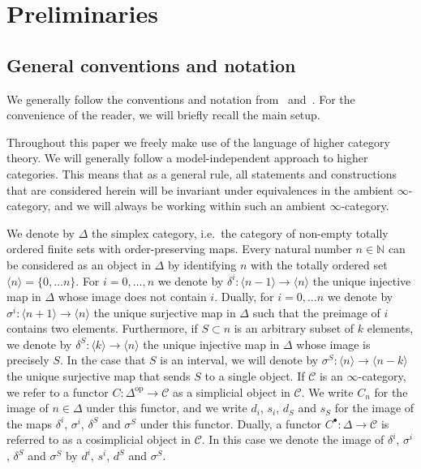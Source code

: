 \documentclass[reqno]{amsart}
\numberwithin{equation}{subsection}
\theoremstyle{plain}
\theoremstyle{definition}
\let\scr=\mathcal
\def\CC{\scr C}
\newcommand{\op}{\mathrm{op}}
\newcommand{\ord}[1]{\langle#1\rangle}
\begin{document}
\section{Preliminaries}

\subsection{General conventions and notation}
We generally follow the conventions and notation from~\cite{Martini2021} and~\cite{Martini2021a}. For the convenience of the reader, we will briefly recall the main setup. 

Throughout this paper we freely make use of the language of higher category theory. We will generally follow a model-independent approach to higher categories. This means that as a general rule, all statements and constructions that are considered herein will be invariant under equivalences in the ambient $\infty$-category, and we will always be working within such an ambient $\infty$-category.

We denote by $\Delta$ the simplex category, i.e.\ the category of non-empty totally ordered finite sets with order-preserving maps. Every natural number $n\in\mathbb N$ can be considered as an object in $\Delta$ by identifying $n$ with the totally ordered set $\ord{n}=\{0,\dots n\}$. For $i=0,\dots,n$ we denote by $\delta^i\colon \ord{n-1}\to \ord{n}$ the unique injective map in $\Delta$ whose image does not contain $i$. Dually, for $i=0,\dots n$ we denote by $\sigma^i\colon \ord{n+1}\to \ord{n}$ the unique surjective map in $\Delta$ such that the preimage of $i$ contains two elements. Furthermore, if $S\subset n$ is an arbitrary subset of $k$ elements, we denote by $\delta^S\colon \ord{k}\to \ord{n}$ the unique injective map in $\Delta$ whose image is precisely $S$. In the case that $S$ is an interval, we will denote by $\sigma^S\colon \ord{n}\to \ord{n-k}$ the unique surjective map that sends $S$ to a single object. If $\CC$ is an $\infty$-category, we refer to a functor $C\colon\Delta^{\op}\to\CC$ as a simplicial object in $\CC$. We write $C_n$ for the image of $n\in\Delta$ under this functor, and we write $d_i$, $s_i$, $d_S$ and $s_S$ for the image of the maps $\delta^i$, $\sigma^i$, $\delta^S$ and $\sigma^S$ under this functor. Dually, a functor $C^{\bullet}\colon \Delta\to\CC$ is referred to as a cosimplicial object in $\CC$. In this case we denote the image of $\delta^i$, $\sigma^i$, $\delta^S$ and $\sigma^S$ by $d^i$, $s^i$, $d^S$ and $\sigma^S$.
\end{document}
